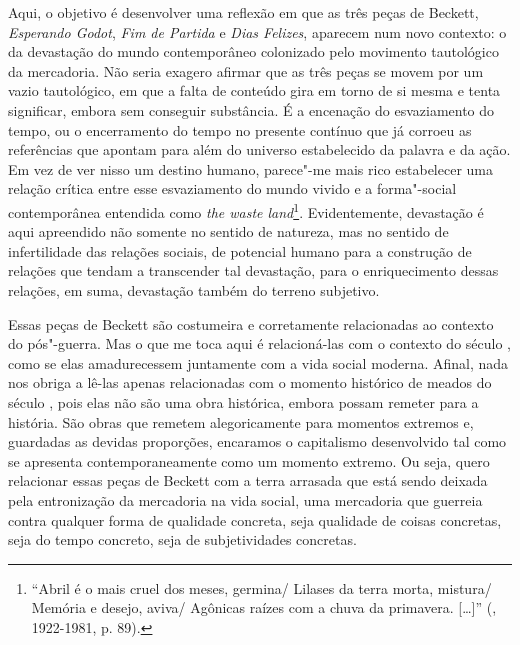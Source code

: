 Aqui, o objetivo é desenvolver uma reflexão em que as três peças de Beckett,
\emph{Esperando Godot}, \emph{Fim de Partida} e \emph{Dias Felizes},
aparecem num novo contexto: o da devastação do mundo contemporâneo
colonizado pelo movimento tautológico da mercadoria. Não seria exagero
afirmar que as três peças se movem por um vazio tautológico, em que a
falta de conteúdo gira em torno de si mesma e tenta significar, embora
sem conseguir substância. É a encenação do esvaziamento do tempo, ou o
encerramento do tempo no presente contínuo que já corroeu as referências
que apontam para além do universo estabelecido da palavra e da ação. Em
vez de ver nisso um destino humano, parece"-me mais rico estabelecer uma
relação crítica entre esse esvaziamento do mundo vivido e a forma"-social
contemporânea entendida como \emph{the waste land}\footnote{``Abril é o
  mais cruel dos meses, germina/ Lilases da terra morta, mistura/
  Memória e desejo, aviva/ Agônicas raízes com a chuva da primavera.
  [\ldots{}]'' (, 1922-1981, p. 89).}. Evidentemente,
devastação é aqui apreendido não somente no sentido de natureza, mas no
sentido de infertilidade das relações sociais, de potencial humano para
a construção de relações que tendam a transcender tal devastação, para o
enriquecimento dessas relações, em suma, devastação também do terreno
subjetivo.

Essas peças de Beckett são costumeira e corretamente relacionadas ao
contexto do pós"-guerra. Mas o que me toca aqui é relacioná-las com o
contexto do século , como se elas amadurecessem juntamente com a vida
social moderna. Afinal, nada nos obriga a lê-las apenas relacionadas com
o momento histórico de meados do século , pois elas não são uma obra
histórica, embora possam remeter para a história. São obras que remetem alegoricamente
para momentos extremos e, guardadas as devidas proporções, encaramos o
capitalismo desenvolvido tal como se apresenta contemporaneamente como
um momento extremo. Ou seja, quero relacionar essas peças de Beckett
com a terra arrasada que está sendo deixada pela entronização da
mercadoria na vida social, uma mercadoria que guerreia contra qualquer
forma de qualidade concreta, seja qualidade de coisas concretas, seja do
tempo concreto, seja de subjetividades concretas.

